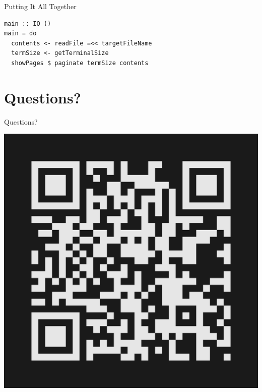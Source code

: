 \documentclass[10pt, presentation, colorlinks]{beamer}
\begin{document}
\begin{frame}[label={sec:org9e904d9},fragile]{Putting It All Together}
 \begin{verbatim}
main :: IO ()
main = do
  contents <- readFile =<< targetFileName
  termSize <- getTerminalSize
  showPages $ paginate termSize contents
\end{verbatim}
\end{frame}

\section{Questions?}
\label{sec:orgae1c039}

\begin{frame}[label={sec:orge03faa2}]{Questions?}

\bigskip
\begin{center}
\includegraphics[height=0.5\textheight]{./img/typeform-url.png}
\end{center}
\end{frame}
\end{document}
